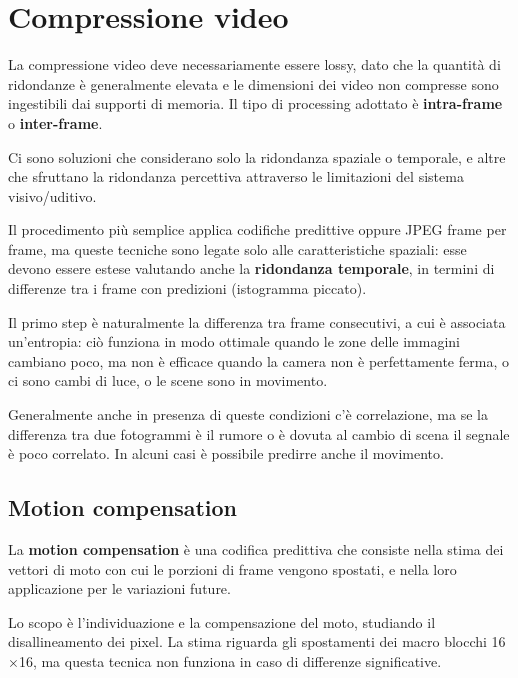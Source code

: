 \section{Compressione video}
La compressione video deve necessariamente essere lossy, dato che la quantità di ridondanze è generalmente elevata e le dimensioni dei video non compresse sono ingestibili dai supporti di memoria. Il tipo di processing adottato è \textbf{intra-frame} o \textbf{inter-frame}. 

Ci sono soluzioni che considerano solo la ridondanza spaziale o temporale, e altre che sfruttano la ridondanza percettiva attraverso le limitazioni del sistema visivo/uditivo. 

Il procedimento più semplice applica codifiche predittive oppure JPEG frame per frame, ma queste tecniche sono legate solo alle caratteristiche spaziali: esse devono essere estese valutando anche la \textbf{ridondanza temporale}, in termini di differenze tra i frame con predizioni (istogramma piccato).

Il primo step è naturalmente la differenza tra frame consecutivi, a cui è associata un'entropia: ciò funziona in modo ottimale quando le zone delle immagini cambiano poco, ma non è efficace quando la camera non è perfettamente ferma, o ci sono cambi di luce, o le scene sono in movimento.

Generalmente anche in presenza di queste condizioni c'è correlazione, ma se la differenza tra due fotogrammi è il rumore o è dovuta al cambio di scena il segnale è poco correlato. In alcuni casi è possibile predirre anche il movimento.

\subsection{Motion compensation}
La \textbf{motion compensation} è una codifica predittiva che consiste nella stima dei vettori di moto con cui le porzioni di frame vengono spostati, e nella loro applicazione per le variazioni future. 

Lo scopo è l'individuazione e la compensazione del moto, studiando il disallineamento dei pixel. La stima riguarda gli spostamenti dei macro blocchi 16$\times$16, ma questa tecnica non funziona in caso di differenze significative.

